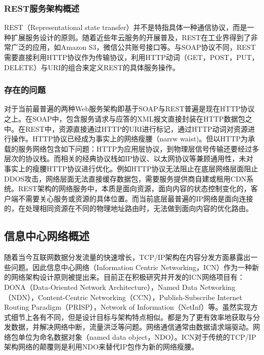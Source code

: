\subsubsection{REST服务架构概述}
REST（Representational state transfer）并不是特指具体一种通信协议，而是一种扩展服务设计的原则。随着近些年云服务的开展普及，REST在工业界得到了非常广泛的应用，如Amazon S3，微信公共账号接口等。与SOAP协议不同，REST需要直接利用HTTP协议作为传输协议，利用HTTP动词（GET，POST，PUT，DELETE）与URI的组合来定义REST的具体服务操作。

\subsubsection{存在的问题}

对于当前最普遍的两种Web服务架构即基于SOAP与REST普遍是现在HTTP协议之上。在SOAP中，包含服务请求与应答的XML报文直接封装在HTTP数据包之中。在REST中，资源直接通过HTTP的URI进行标记，通过HTTP动词对资源进行操作。HTTP协议已经成为事实上的网络瘦腰（narrw waist)。\cite{popa2010http}但以HTTP为承载的服务网络包含如下问题：HTTP为应用层协议，到物理层信号传输还要经过多层次的协议栈。而相关的经典协议栈如IP协议、以太网协议等兼顾通用性，未对事实上的瘦腰HTTP协议进行优化。例如HTTP协议无法阻止在底层网络层面阻止DDOS攻击，网络层面无法直接缓存数据包，需要服务提供商自建或租用CDN系统。REST架构的网络服务中，本质是面向资源，面向内容的状态控制变化的，客户端不需要关心服务或资源的具体位置。而当前底层最普遍的IP网络是面向连接的，在处理相同资源在不同的物理地址路由时，无法做到面向内容的优化路由。

\subsection{信息中心网络概述}

随着当今互联网数据分发流量的快速增长，TCP/IP架构在内容分发方面暴露出一些问题。因此信息中心网络（Information Centric Networking，ICN）作为一种新的网络架构设计原则被提出来。目前正在积极研究并开发的ICN网络项目有：DONA（Data-Oriented Network Architecture）\cite{koponen2007data}，Named Data Networking（NDN）\cite{jacobson2009networking}，Content-Centric Networking（CCN）\cite{jacobson2009networking}，Publish-Subscribe Internet Routing Paradigm（PRISP）\cite{ain2009d2}，Network of Information（NetInf）\cite{ahlgren2010second}等。虽然实现方式细节上各有不同，但是设计目标与架构特点相似。都是为了更有效率地获取与分发数据，并解决网络中断，流量洪泛等问题。网络通信通常由数据请求端驱动。网络包单位为命名数据对象（named data object，NDO）。\cite{ahlgren2012survey}ICN对于传统的TCP/IP架构网络的颠覆则是利用NDO来替代IP包作为新的网络瘦腰。

